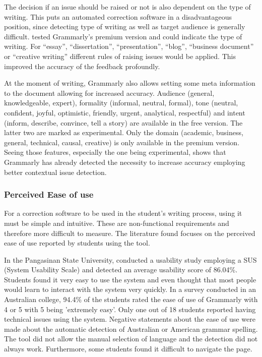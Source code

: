 \documentclass[runningheads]{llncs}
\let\OldTextregistered\textregistered
\renewcommand{\textregistered}{\OldTextregistered\xspace}%
\begin{document}
The decision if an issue should be raised or not is also dependent on the type of writing. This puts an automated correction software in a disadvantageous position, since detecting type of writing as well as target audience is generally difficult. \textcite{cavaleri_you_2016} tested Grammarly\textregistered's premium version and could indicate the type of writing. For ``essay'', ``dissertation'', ``presentation'', ``blog'', ``business document'' or ``creative writing'' different rules of raising issues would be applied. This improved the accuracy of the feedback profoundly.

At the moment of writing, Grammarly\textregistered also allows setting some meta information to the document allowing for increased accuracy. Audience (general, knowledgeable, expert), formality (informal, neutral, formal), tone (neutral, confident, joyful, optimistic, friendly, urgent, analytical, respectful) and intent (inform, describe, convince, tell a story) are available in the free version. The latter two are marked as experimental. Only the domain (academic, business, general, technical, causal, creative) is only available in the premium version. Seeing those features, especially the one being experimental, shows that Grammarly\textregistered has already detected the necessity to increase accuracy employing better contextual issue detection.

\subsubsection{Perceived Ease of use}
For a correction software to be used in the student's writing process, using it must be simple and intuitive. These are non-functional requirements and therefore more difficult to measure. The literature found focuses on the perceived ease of use reported by students using the tool.

In the Pangasinan State University, \textcite{ventayen_graduate_2018} conducted a usability study employing a SUS (System Usability Scale) and detected an average usability score of 86.04\%. Students found it very easy to use the system and even thought that most people would learn to interact with the system very quickly. In a survey \citep{cavaleri_you_2016} conducted in an Australian college, 94.4\% of the students rated the ease of use of Grammarly\textregistered with 4 or 5 with 5 being 'extremely easy'. Only one out of 18 students reported having technical issues using the system. Negative statements about the ease of use were made about the automatic detection of Australian or American grammar spelling. The tool did not allow the manual selection of language and the detection did not always work. Furthermore, some students found it difficult to navigate the page.
\end{document}
